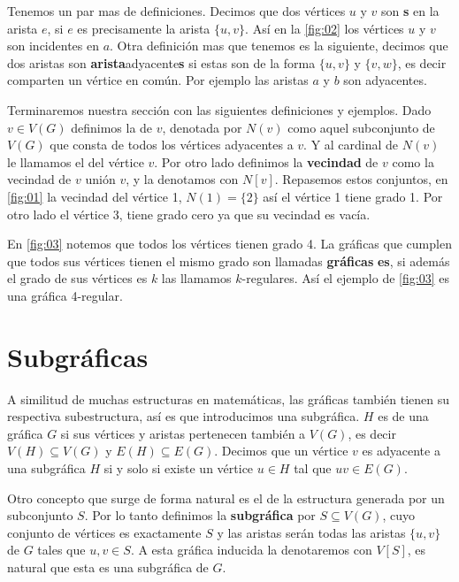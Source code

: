 Tenemos un par mas de definiciones. Decimos que dos vértices $u$ y $v$ son
\textbf{s} en la arista $e$, si $e$ es
precisamente la arista $\{ u,v\}$. Así en la \cref{fig:02} los vértices $u$ y
$v$ son incidentes en $a$. Otra definición mas que tenemos es la siguiente,
decimos que dos aristas son \indice\textbf{arista}{adyacente}\textbf{s} si estas
son de la forma $\{ u,v\}$ y $\{ v,w\}$, es decir comparten un vértice en común.
Por ejemplo las aristas $a$ y $b$ son adyacentes. 

Terminaremos nuestra sección con las siguientes definiciones y ejemplos. Dado
$v\in V(G)$ definimos la  de $v$, denotada por $N(v)$ como
aquel subconjunto de $V(G)$ que consta de todos los vértices adyacentes a $v$. Y
al cardinal de $N(v)$ le llamamos el  del vértice $v$.
Por otro lado definimos la \textbf{vecindad}  de
$v$ como la vecindad de $v$ unión $v$, y la denotamos con $N[v]$. Repasemos
estos conjuntos, en \cref{fig:01} la vecindad del vértice 1, $N(1)= \{ 2 \}$
así el vértice 1 tiene grado 1. Por otro lado el vértice 3, tiene grado cero ya
que su vecindad es vacía.

En \cref{fig:03} notemos que todos los vértices tienen grado 4. La gráficas que
cumplen que todos sus vértices tienen el mismo grado son llamadas
\textbf{gráficas} \textbf{es}, si además el grado de
sus vértices es $k$ las llamamos $k$-regulares. Así el ejemplo de \cref{fig:03}
es una gráfica 4-regular.

\section{Subgráficas}
\label{sec:SbGrfcs}

A similitud de muchas estructuras en matemáticas, las gráficas también tienen su
respectiva subestructura, así es que introducimos una subgr\'afica. $H$ es
 de una gráfica $G$ si sus vértices y aristas pertenecen
también a $V(G)$, es decir $V(H)\subseteq V(G)$ y $E(H) \subseteq E(G) $.
Decimos que un vértice $v$ es adyacente a una subgráfica $H$ si y solo si existe
un vértice $u\in H$ tal que $uv\in E(G)$.

Otro concepto que surge de forma natural es el de la estructura generada por un
subconjunto $S$. Por lo tanto definimos la \textbf{subgráfica}
 por $S\subseteq V(G)$, cuyo conjunto de
vértices es exactamente $S$ y las aristas serán todas las aristas $\{u,v\} $ de
$G$ tales que $u,v \in S$. A esta gráfica inducida la denotaremos con $V[S]$, es
natural que esta es una subgráfica de $G$.

